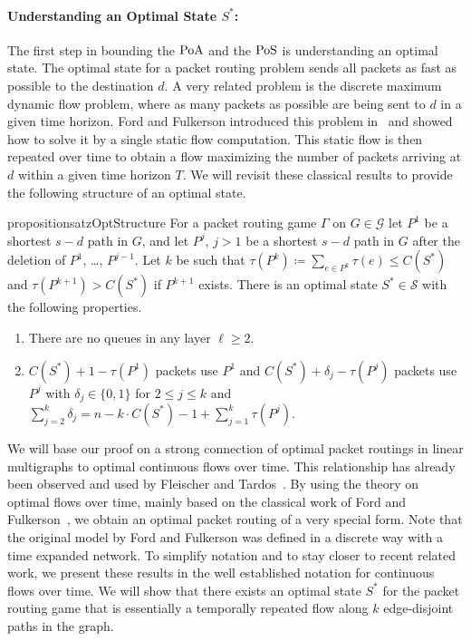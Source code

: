 \paragraph{Understanding an Optimal State $S^*$:}
\label{sec:understandingopt}
The first step in bounding the $\operatorname*{PoA}$ and the $\operatorname*{PoS}$ is understanding an optimal state. The optimal state for a packet routing problem sends all packets as fast as possible to the destination $d$. A very related problem is the discrete maximum dynamic flow problem, where as many packets as possible are being sent to $d$ in a given time horizon. Ford and Fulkerson introduced this problem in~\cite{ford1958constructing} and showed how to solve it by a single static flow computation. This static flow is then repeated over time to obtain a flow maximizing the number of packets arriving at $d$ within a given time horizon $T$. We will revisit these classical results to provide the following structure of an optimal state. 

\begin{restatable}{proposition}{satzOptStructure}\label{thm:opt}
For a packet routing game $\Gamma$ on $G\in\mathcal{G}$ let $P^1$ be a shortest $s-d$ path in $G$, and let $P^j$, $j>1$ be a shortest $s-d$ path in $G$ after the deletion of $P^1$, \dots, $P^{j-1}$. Let $k$ be such that $\tau(P^{k}) \coloneqq \sum_{e\in P^k} \tau(e)\leq C(S^*)$ and $\tau(P^{k+1})> C(S^*)$ if $P^{k+1}$ exists. There is an optimal state $S^*\in\mathcal{S}$ with the following properties.
    \begin{enumerate}
        \item There are no queues in any layer $\ell\geq 2$.
        \item $C(S^*)+1-\tau(P^1)$ packets use $P^1$ and $C(S^*)+\delta_j -\tau(P^j)$ packets use $P^j$ with $\delta_j\in\{0,1\}$ for $2\leq j \leq k$ and $\sum_{j=2}^k \delta_j = n-k\cdot C(S^*) -1 +\sum_{j=1}^k \tau(P^j)$.
    \end{enumerate}
\end{restatable}
















\iffalse
We will base our proof on a strong connection of optimal packet routings in linear multigraphs to optimal continuous flows over time. This relationship has already been observed and used by Fleischer and Tardos~\cite{DBLP:journals/orl/FleischerT98}. By using the theory on optimal flows over time, mainly based on the classical work of Ford and Fulkerson~\cite{ford1958constructing}, we obtain an optimal packet routing of a very special form. Note that the original model by Ford and Fulkerson was defined in a discrete way with a time expanded network. To simplify notation and to stay closer to recent related work, we present these results in the well established notation for continuous flows over time. We will show that there exists an optimal state $S^*$ for the packet routing game that is essentially a temporally repeated flow along $k$ edge-disjoint paths in the graph.





